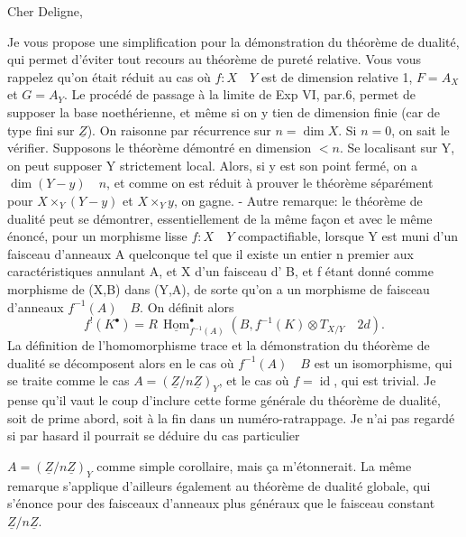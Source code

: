 


Cher Deligne,

Je vous propose une simplification pour la démonstration du théorème de dualité, qui permet d'éviter tout recours au théorème de pureté relative. Vous vous rappelez qu'on était réduit au cas où $f:X\quad Y$ est de dimension relative 1, $F=A_X$ et $G=A_Y$. Le procédé de passage à la limite de Exp VI, par.6, permet de supposer la base noethérienne, et même si on y tien de dimension finie (car de type fini sur $\underline Z$). On raisonne par récurrence sur $n=\dim X$. Si $n=0$, on sait le vérifier. Supposons le théorème démontré en dimension $<n$. Se localisant sur Y, on peut supposer Y strictement local. Alors, si y est son point fermé, on a $\dim(Y-y)\quad n$, et comme on est réduit à prouver le théorème séparément pour $X\times_Y(Y-y)$ et $X\times_Y y$, on gagne. - Autre remarque: le théorème de dualité peut se démontrer, essentiellement de la même façon et avec le même énoncé, pour un morphisme lisse $f:X\quad Y$ compactifiable, lorsque Y est muni d'un faisceau d'anneaux A quelconque tel que il existe un entier n premier aux caractéristiques  annulant A, et X d'un faisceau d' B, et f étant donné comme morphisme de (X,B) dans (Y,A), de sorte qu'on a un morphisme de faisceau d'anneaux $f^{-1}(A)\quad B$. On définit alors
\[
f^{!}(K^{\bullet})=R\,\underline{\operatorname{Hom}}^{\bullet}_{f^{-1}(A)}(B,f^{-1}(K)\otimes T_{X/Y}\quad 2d).
\]
La définition de l'homomorphisme trace et la démonstration du théorème de dualité se décomposent alors en le cas où $f^{-1}(A)\quad B$ est un isomorphisme, qui se traite comme le cas $A=(\underline Z/n\underline Z)_Y$, et le cas où $f=\operatorname{id}$, qui est trivial. Je pense qu'il vaut le coup d'inclure cette forme générale du théorème de dualité, soit de prime abord, soit à la fin dans un numéro-ratrappage. Je n'ai pas regardé si par hasard il pourrait se déduire du cas particulier


$A=(\underline Z/n\underline Z)_Y$ comme simple corollaire, mais ça m'étonnerait. La même remarque s'applique d'ailleurs également au théorème de dualité globale, qui s'énonce pour des faisceaux d'anneaux plus généraux que le faisceau constant $\underline Z/n\underline Z$.

